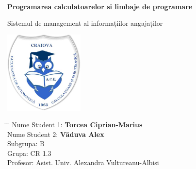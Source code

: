 \documentclass[12pt,a4paper]{article}
\begin{document}
	
	\newcommand{\subf}[2]{%
		{\small\begin{tabular}[t]{@{}c@{}}
				#1\\#2
		\end{tabular}}%
	}
	
	\begin{titlepage}
		\begin{center}
			\vspace*{3cm}
			
			\Large
			\textbf{Programarea calculatoarelor si limbaje de programare}
			
			\vspace{0.3cm}
				\Large
			Sistemul de management al informațiilor angajaților
			
			\vspace{0.8cm}
			\large
			
			
			\vspace{0.5cm}
			\LARGE
			
			\vspace{1.5cm}
			
			\textbf{}
            \includegraphics[width=0.3\textwidth]{logo-ace.jpg}
			
			\vfill
			\vspace{0.6cm}
	
			\Large
			
		\end{center}
		\Large
		\begin{tabbing}
			\hspace*{1em}\= \hspace*{8em} \= \kill %
			\> Nume Student 1:\>  \textbf{Torcea Ciprian-Marius} \\
                \> Nume Student 2:\>  \textbf{Văduva Alex} \\
			\> Subgrupa:\>  B \\
			\> Grupa:\>  CR 1.3 \\
			\> Profesor:  \> Asist. Univ. Alexandra Vultureanu-Albisi  \\
		\end{tabbing}
	\end{titlepage}
	
\end{document}
